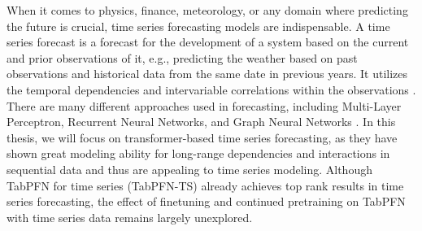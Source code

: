 When it comes to physics, finance, meteorology, or any domain where predicting the future is crucial, time series forecasting models are indispensable.
A time series forecast is a forecast for the development of a system based on the current and prior observations of it, e.g., predicting the weather based on past observations and historical data from the same date in previous years.
It utilizes the temporal dependencies and intervariable correlations within the observations \citep{wang2024deep}.
\newline
There are many different approaches used in forecasting, including Multi-Layer Perceptron, Recurrent Neural Networks, and Graph Neural Networks \citep{wang2024deep}.
In this thesis, we will focus on transformer-based time series forecasting, as they have shown great modeling ability for long-range dependencies and interactions in sequential data and thus are appealing to time series modeling.
\newline
Although TabPFN for time series (TabPFN-TS) already achieves top rank results in time series forecasting, the effect of finetuning and continued pretraining on TabPFN with time series data remains largely unexplored.
